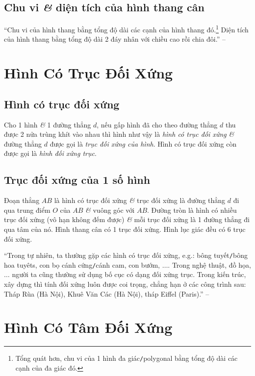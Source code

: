 \documentclass[oneside]{book}
\numberwithin{equation}{section}
\begin{document}
\subsection{Chu vi \textit{\&} diện tích của hình thang cân}
``Chu vi của hình thang bằng tổng độ dài các cạnh của hình thang đó.\footnote{Tổng quát hơn, chu vi của 1 hình đa giác\texttt{/}polygonal bằng tổng độ dài các cạnh của đa giác đó.} Diện tích của hình thang bằng tổng độ dài 2 đáy nhân với chiều cao rồi chia đôi.'' -- \cite[p. 106]{Thai_Anh_Dat_Ha_Loan_Nam_Quang_Toan_6_tap_1}

\section{Hình Có Trục Đối Xứng}

\subsection{Hình có trục đối xứng}
Cho 1 hình \textit{\&} 1 đường thẳng $d$, nếu gấp hình đã cho theo đường thẳng $d$ thu được 2 nửa trùng khít vào nhau thì hình như vậy là \textit{hình có trục đối xứng} \textit{\&} đường thẳng $d$ được gọi là \textit{trục đối xứng của hình}. Hình có trục đối xứng còn được gọi là \textit{hình đối xứng trục}.

\subsection{Trục đối xứng của 1 số hình}
Đoạn thẳng $AB$ là hình có trục đối xứng \textit{\&} trục đối xứng là đường thẳng $d$ đi qua trung điểm $O$ của $AB$ \textit{\&} vuông góc với $AB$. Đường tròn là hình có nhiều trục đối xứng (vô hạn không đếm được) \textit{\&} mỗi trục đối xứng là 1 đường thẳng đi qua tâm của nó. Hình thang cân có 1 trục đối xứng. Hình lục giác đều có 6 trục đối xứng.

``Trong tự nhiên, ta thường gặp các hình có trục đối xứng, e.g.: bông tuyết\texttt{/}bông hoa tuyêts, con bọ cánh cứng\texttt{/}cánh cam, con bướm, $\ldots$. Trong nghệ thuật, đồ họa, $\ldots$ người ta cũng thường sử dụng bố cục có dạng đối xứng trục. Trong kiến trúc, xây dựng thì tính đối xứng luôn được coi trọng, chẳng hạn ở các công trình sau: Tháp Rùa (Hà Nội), Khuê Văn Các (Hà Nội), tháp Eiffel (Paris).'' -- \cite[p. 110]{Thai_Anh_Dat_Ha_Loan_Nam_Quang_Toan_6_tap_1}

\section{Hình Có Tâm Đối Xứng}
\end{document}
